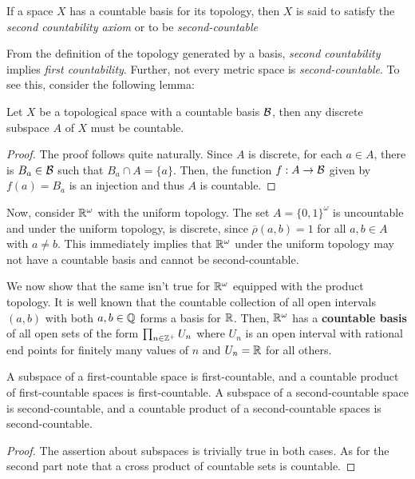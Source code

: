 \begin{definition}
    If a space $X$ has a countable basis for its topology, then $X$ is said to satisfy the \textit{second countability axiom} or to be \textit{second-countable}
\end{definition}

From the definition of the topology generated by a basis, \textit{second countability} implies \textit{first countability}. Further, not every metric space is \textit{second-countable}. To see this, consider the following lemma:
\begin{lemma}
    Let $X$ be a topological space with a countable basis $\mathcal{B}$, then any discrete subspace $A$ of $X$ must be countable.
\end{lemma}
\begin{proof}
    The proof follows quite naturally. Since $A$ is discrete, for each $a\in A$, there is $B_a\in\mathcal{B}$ such that $B_a\cap A = \{a\}$. Then, the function $f:A\to\mathcal{B}$ given by $f(a) = B_a$ is an injection and thus $A$ is countable.
\end{proof}

Now, consider $\mathbb{R}^\omega$ with the uniform topology. The set $A = \{0,1\}^\omega$ is uncountable and under the uniform topology, is discrete, since $\overline{\rho}(a,b) = 1$ for all $a,b\in A$ with $a\ne b$. This immediately implies that $\mathbb{R}^\omega$ under the uniform topology may not have a countable basis and cannot be second-countable.

We now show that the same isn't true for $\mathbb{R}^\omega$ equipped with the product topology. It is well known that the countable collection of all open intervals $(a,b)$ with both $a,b\in\mathbb{Q}$ forms a basis for $\mathbb{R}$. Then, $\mathbb{R}^\omega$ has a \textbf{countable basis} of all open sets of the form $\prod_{n\in\mathbb{Z}^+}U_n$ where $U_n$ is an open interval with rational end points for finitely many values of $n$ and $U_n = \mathbb{R}$ for all others.

\begin{theorem}
    A subspace of a first-countable space is first-countable, and a countable product of first-countable spaces is first-countable. A subspace of a second-countable space is second-countable, and a countable product of a second-countable spaces is second-countable.
\end{theorem}
\begin{proof}
    The assertion about subspaces is trivially true in both cases. As for the second part note that a cross product of countable sets is countable.
\end{proof}

